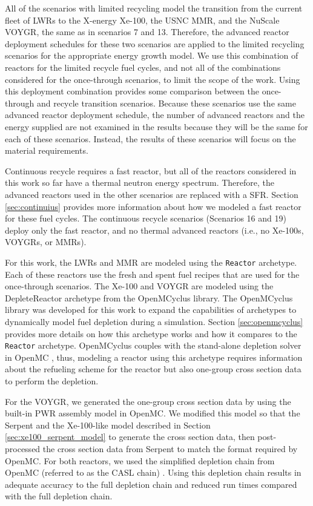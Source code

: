 All of the scenarios with limited recycling model the transition from the 
current fleet of \glspl{LWR} to the X-energy Xe-100, the \gls{USNC} \gls{MMR}, 
and the NuScale VOYGR, the same as in scenarios 7 and 13. Therefore, 
the advanced reactor deployment schedules for these two scenarios are applied 
to the limited recycling scenarios for the appropriate energy growth model. 
We use this combination 
of reactors for the limited recycle fuel cycles, and not all of the 
combinations considered for the once-through scenarios, to limit the scope 
of the work. Using this deployment combination provides some comparison between the 
once-through and recycle transition scenarios. Because these scenarios 
use the same advanced reactor deployment schedule, the number of 
advanced reactors and the energy supplied are not examined in the 
results because they will be the same for each of these scenarios. Instead, 
the results of these scenarios will focus on the material requirements. 

Continuous recycle 
requires a fast reactor, but all of the reactors considered in this 
work so far have a thermal neutron energy spectrum. Therefore, the advanced 
reactors used in the other scenarios are replaced with a \gls{SFR}. Section 
\ref{sec:continuius} provides more information about how we 
modeled a fast reactor for these fuel cycles. The continuous recycle 
scenarios (Scenarios 16 and 19) deploy only the fast reactor, and no 
thermal advanced reactors (i.e., no Xe-100s, VOYGRs, or \glspl{MMR}).

For this work, the \glspl{LWR} and \gls{MMR} are modeled using the 
\Cycamore \texttt{Reactor} archetype. Each of these reactors use the 
fresh and spent fuel recipes that are used for the once-through scenarios. 
The Xe-100 and VOYGR are modeled using the DepleteReactor 
archetype from the OpenMCyclus library. The OpenMCyclus library was 
developed for this work to expand the capabilities of \Cyclus archetypes 
to dynamically model fuel depletion during a simulation. Section 
\ref{sec:openmcyclus} provides more details on how this archetype 
works and how it compares to the \Cycamore \texttt{Reactor} 
archetype. OpenMCyclus couples with the stand-alone depletion 
solver in OpenMC \cite{romano_depletion_2021}, thus, modeling a 
reactor using this archetype requires information about the refueling 
scheme for the reactor but also one-group cross section data to perform the 
depletion. 

For the VOYGR, we generated the one-group cross section data by using the 
built-in \gls{PWR} assembly model in OpenMC. We modified this model so 
that the Serpent \cite{leppanen_serpent_2014} 
and the Xe-100-like model described in Section 
\ref{sec:xe100_serpent_model} to generate the cross section data, then
post-processed the cross section data from Serpent to match the 
format required by OpenMC. For both reactors, we used the simplified 
depletion chain from OpenMC (referred to as the CASL chain) 
\cite{romano_depletion_2021}. Using this depletion chain results in  
adequate accuracy to the full depletion chain \cite{romano_depletion_2021}
and reduced run times compared with the full depletion chain.  

